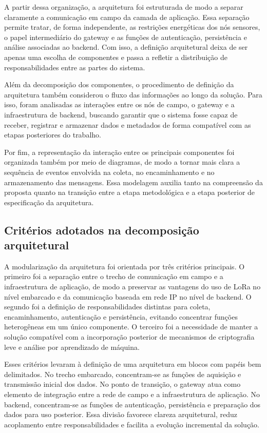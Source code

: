 A partir dessa organização, a arquitetura foi estruturada de modo a separar claramente a comunicação em campo da camada de aplicação. Essa separação permite tratar, de forma independente, as restrições energéticas dos nós sensores, o papel intermediário do gateway e as funções de autenticação, persistência e análise associadas ao backend. Com isso, a definição arquitetural deixa de ser apenas uma escolha de componentes e passa a refletir a distribuição de responsabilidades entre as partes do sistema.

Além da decomposição dos componentes, o procedimento de definição da arquitetura também considerou o fluxo das informações ao longo da solução. Para isso, foram analisadas as interações entre os nós de campo, o gateway e a infraestrutura de backend, buscando garantir que o sistema fosse capaz de receber, registrar e armazenar dados e metadados de forma compatível com as etapas posteriores do trabalho.

Por fim, a representação da interação entre os principais componentes foi organizada também por meio de diagramas, de modo a tornar mais clara a sequência de eventos envolvida na coleta, no encaminhamento e no armazenamento das mensagens. Essa modelagem auxilia tanto na compreensão da proposta quanto na transição entre a etapa metodológica e a etapa posterior de especificação da arquitetura.

\subsection{Critérios adotados na decomposição arquitetural}

A modularização da arquitetura foi orientada por três critérios principais. O primeiro foi a separação entre o trecho de comunicação em campo e a infraestrutura de aplicação, de modo a preservar as vantagens do uso de LoRa no nível embarcado e da comunicação baseada em rede IP no nível de backend. O segundo foi a definição de responsabilidades distintas para coleta, encaminhamento, autenticação e persistência, evitando concentrar funções heterogêneas em um único componente. O terceiro foi a necessidade de manter a solução compatível com a incorporação posterior de mecanismos de criptografia leve e análise por aprendizado de máquina.

Esses critérios levaram à definição de uma arquitetura em blocos com papéis bem delimitados. No trecho embarcado, concentram-se as funções de aquisição e transmissão inicial dos dados. No ponto de transição, o gateway atua como elemento de integração entre a rede de campo e a infraestrutura de aplicação. No backend, concentram-se as funções de autenticação, persistência e preparação dos dados para uso posterior. Essa divisão favorece clareza arquitetural, reduz acoplamento entre responsabilidades e facilita a evolução incremental da solução.

